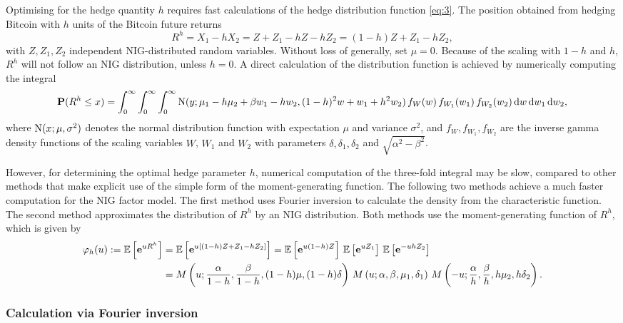 Optimising for the hedge quantity $h$ requires fast calculations of
the hedge distribution function \eqref{eq:3}. The position obtained
from hedging Bitcoin with $h$ units of the Bitcoin future returns
\begin{equation*}
  R^h = X_1 - h X_2 = Z + Z_1 - h Z - h Z_2 = (1-h) Z + Z_1 - h Z_2,
\end{equation*}
with $Z, Z_1, Z_2$ independent NIG-distributed random
variables. Without loss of generally, set $\mu=0$. Because of the
scaling with $1-h$ and $h$, $R^h$ will not follow an NIG distribution,
unless $h=0$.  A direct calculation of the distribution function is
achieved by numerically computing the integral
\begin{equation*}
  {\bf P}(R^h\leq x) = \int_0^\infty \int_0^\infty \int_0^\infty
  {\rm N}(y; \mu_1 - h \mu_2 + \beta w_1 - h w_2, (1-h)^2 w + w_1 + h^2
  w_2)\, f_W(w)\, f_{W_1}(w_1)\, f_{W_2} (w_2)\, {\rm d} w\, {\rm d} w_1\, {\rm d} w_2,
\end{equation*}
where ${\rm N}(x; \mu, \sigma^2)$ denotes the normal distribution
function with expectation $\mu$ and variance $\sigma^2$, and
$f_W, f_{W_1}, f_{W_2}$ are the inverse gamma density functions of the
scaling variables $W$, $W_1$ and $W_2$ with parameters
$\delta, \delta_1, \delta_2$ and $\sqrt{\alpha^2-\beta^2}$. 

However, for determining the optimal hedge parameter $h$, numerical
computation of the three-fold integral may be slow, compared to other
methods that make explicit use of the simple form of the
moment-generating function.  The following two methods achieve a much
faster computation for the NIG factor model.  The first method uses
Fourier inversion to calculate the density from the characteristic
function. The second method approximates the distribution of $R^h$ by
an NIG distribution.  Both methods use the moment-generating function
of $R^h$, which is given by
\begin{align}
  \varphi_h(u):=\E\left[\e^{u R^h}\right]
  &= \E\left[ \e^{u[(1-h) Z + Z_1 -h Z_2]}\right] %
    = \E\left[ \e^{u(1-h) Z}\right]\, \E\left[ \e^{u Z_1}\right] \,
    \E\left[ \e^{-u h Z_2}\right]\nonumber\\
  &=M\left(u;\frac{\alpha}{1-h}, \frac{\beta}{1-h}, (1-h)\mu,
    (1-h)\delta\right)\,
    M\left(u; \alpha, \beta, \mu_1, \delta_1\right)\,
    M\left(-u; \frac{\alpha}{h}, \frac{\beta}{h}, h\mu_2,
    h\delta_2\right).
    \label{eq:7}
\end{align}


\subsubsection{Calculation via Fourier inversion}
\label{sec:calc-via-four}

